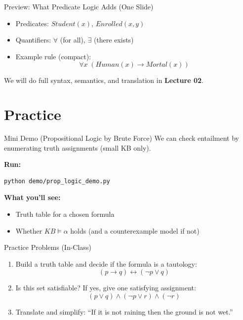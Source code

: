 \documentclass[aspectratio=169]{beamer}
\begin{document}
\begin{frame}{Preview: What Predicate Logic Adds (One Slide)}
  \begin{itemize}[<+->]
    \item Predicates: $Student(x)$, $Enrolled(x,y)$
    \item Quantifiers: $\forall$ (for all), $\exists$ (there exists)
    \item Example rule (compact):
    \[
      \forall x\; (Human(x) \rightarrow Mortal(x))
    \]
  \end{itemize}
  We will do full syntax, semantics, and translation in \textbf{Lecture 02}.
\end{frame}

\section{Practice}
\label{sec:practice}

\begin{frame}[fragile]{Mini Demo (Propositional Logic by Brute Force)}
  We can check entailment by enumerating truth assignments (small KB only).

  \vspace{0.6em}
  \textbf{Run:}
  \begin{lstlisting}
python demo/prop_logic_demo.py
  \end{lstlisting}

  \textbf{What you'll see:}
  \begin{itemize}[<+->]
    \item Truth table for a chosen formula
    \item Whether $KB \models \alpha$ holds (and a counterexample model if not)
  \end{itemize}
\end{frame}

\begin{frame}{Practice Problems (In-Class)}
  \begin{enumerate}[<+->]
    \item Build a truth table and decide if the formula is a tautology:
    \[
      (p \rightarrow q) \leftrightarrow (\lnot p \lor q)
    \]
    \item Is this set satisfiable? If yes, give one satisfying assignment:
    \[
      (p \lor q) \land (\lnot p \lor r) \land (\lnot r)
    \]
    \item Translate and simplify: ``If it is not raining then the ground is not wet.''
  \end{enumerate}
\end{frame}
\end{document}
